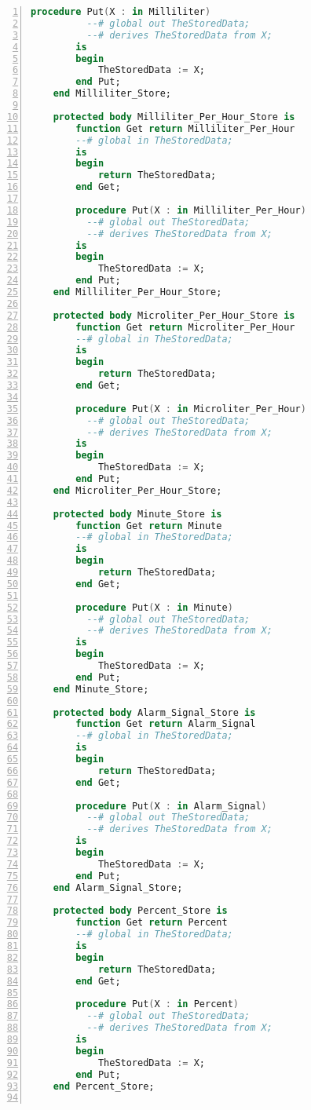 \begin{lstlisting}[language=ada, gobble=0, numbers=left, caption={\lstinline{Ice_Types} package}, label={listing:pca_generated:ice_types}]
        procedure Put(X : in Milliliter)
          --# global out TheStoredData;
          --# derives TheStoredData from X;
        is
        begin
            TheStoredData := X;
        end Put;
    end Milliliter_Store;

    protected body Milliliter_Per_Hour_Store is
        function Get return Milliliter_Per_Hour
        --# global in TheStoredData;
        is
        begin
            return TheStoredData;
        end Get;

        procedure Put(X : in Milliliter_Per_Hour)
          --# global out TheStoredData;
          --# derives TheStoredData from X;
        is
        begin
            TheStoredData := X;
        end Put;
    end Milliliter_Per_Hour_Store;

    protected body Microliter_Per_Hour_Store is
        function Get return Microliter_Per_Hour
        --# global in TheStoredData;
        is
        begin
            return TheStoredData;
        end Get;

        procedure Put(X : in Microliter_Per_Hour)
          --# global out TheStoredData;
          --# derives TheStoredData from X;
        is
        begin
            TheStoredData := X;
        end Put;
    end Microliter_Per_Hour_Store;

    protected body Minute_Store is
        function Get return Minute
        --# global in TheStoredData;
        is
        begin
            return TheStoredData;
        end Get;

        procedure Put(X : in Minute)
          --# global out TheStoredData;
          --# derives TheStoredData from X;
        is
        begin
            TheStoredData := X;
        end Put;
    end Minute_Store;

    protected body Alarm_Signal_Store is
        function Get return Alarm_Signal
        --# global in TheStoredData;
        is
        begin
            return TheStoredData;
        end Get;

        procedure Put(X : in Alarm_Signal)
          --# global out TheStoredData;
          --# derives TheStoredData from X;
        is
        begin
            TheStoredData := X;
        end Put;
    end Alarm_Signal_Store;

    protected body Percent_Store is
        function Get return Percent
        --# global in TheStoredData;
        is
        begin
            return TheStoredData;
        end Get;

        procedure Put(X : in Percent)
          --# global out TheStoredData;
          --# derives TheStoredData from X;
        is
        begin
            TheStoredData := X;
        end Put;
    end Percent_Store;


\end{lstlisting}
